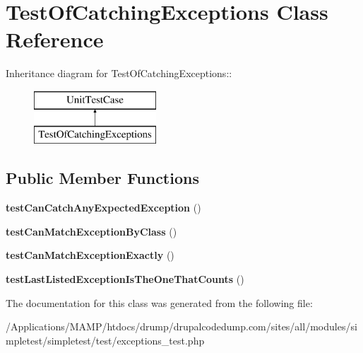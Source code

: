 \hypertarget{class_test_of_catching_exceptions}{
\section{TestOfCatchingExceptions Class Reference}
\label{class_test_of_catching_exceptions}
}
Inheritance diagram for TestOfCatchingExceptions::\begin{figure}[H]
\begin{center}
\leavevmode
\includegraphics[height=2cm]{class_test_of_catching_exceptions}
\end{center}
\end{figure}
\subsection*{Public Member Functions}
\begin{DoxyCompactItemize}
\item 
\hypertarget{class_test_of_catching_exceptions_a231a8c0ed7fef5a4c432f293b06a5efa}{
{\bfseries testCanCatchAnyExpectedException} ()}
\label{class_test_of_catching_exceptions_a231a8c0ed7fef5a4c432f293b06a5efa}

\item 
\hypertarget{class_test_of_catching_exceptions_a9de4798410bcc76e094c9908659f85c9}{
{\bfseries testCanMatchExceptionByClass} ()}
\label{class_test_of_catching_exceptions_a9de4798410bcc76e094c9908659f85c9}

\item 
\hypertarget{class_test_of_catching_exceptions_a93b7a7a779b2fa42dd21e406d4590266}{
{\bfseries testCanMatchExceptionExactly} ()}
\label{class_test_of_catching_exceptions_a93b7a7a779b2fa42dd21e406d4590266}

\item 
\hypertarget{class_test_of_catching_exceptions_abdf22bb055d7dda4fef9354efb0e2ef3}{
{\bfseries testLastListedExceptionIsTheOneThatCounts} ()}
\label{class_test_of_catching_exceptions_abdf22bb055d7dda4fef9354efb0e2ef3}

\end{DoxyCompactItemize}


The documentation for this class was generated from the following file:\begin{DoxyCompactItemize}
\item 
/Applications/MAMP/htdocs/drump/drupalcodedump.com/sites/all/modules/simpletest/simpletest/test/exceptions\_\-test.php\end{DoxyCompactItemize}
